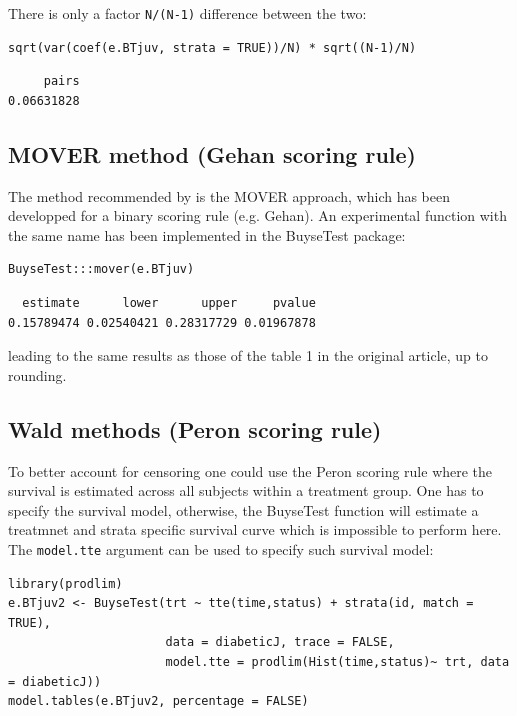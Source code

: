 \documentclass[12pt]{article}
\begin{document}
There is only a factor \texttt{N/(N-1)} difference between the two:
\lstset{language=r,label= ,caption= ,captionpos=b,numbers=none}
\begin{lstlisting}
sqrt(var(coef(e.BTjuv, strata = TRUE))/N) * sqrt((N-1)/N)
\end{lstlisting}

\begin{verbatim}
     pairs 
0.06631828
\end{verbatim}

\subsection{MOVER method (Gehan scoring rule)}
\label{sec:orgc8e0bc3}

The method recommended by \cite{matsouaka2022robust} is the MOVER
approach, which has been developped for a binary scoring rule
(e.g. Gehan). An experimental function with the same name has been
implemented in the BuyseTest package:

\lstset{language=r,label= ,caption= ,captionpos=b,numbers=none}
\begin{lstlisting}
BuyseTest:::mover(e.BTjuv)
\end{lstlisting}
\begin{verbatim}
  estimate      lower      upper     pvalue 
0.15789474 0.02540421 0.28317729 0.01967878
\end{verbatim}


leading to the same results as those of the table 1 in the original article, up to rounding.

\clearpage

\subsection{Wald methods (Peron scoring rule)}
\label{sec:org472d6cc}

To better account for censoring one could use the Peron scoring rule
where the survival is estimated across all subjects within a treatment
group. One has to specify the survival model, otherwise, the BuyseTest
function will estimate a treatmnet and strata specific survival curve
which is impossible to perform here. The \texttt{model.tte} argument can be
used to specify such survival model:
\lstset{language=r,label= ,caption= ,captionpos=b,numbers=none}
\begin{lstlisting}
library(prodlim)
e.BTjuv2 <- BuyseTest(trt ~ tte(time,status) + strata(id, match = TRUE), 
                      data = diabeticJ, trace = FALSE,
                      model.tte = prodlim(Hist(time,status)~ trt, data = diabeticJ))
model.tables(e.BTjuv2, percentage = FALSE)
\end{lstlisting}
\end{document}
